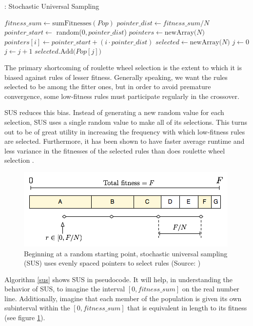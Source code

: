 \documentclass[11pt]{article}
\begin{document}
\begin{algorithm}
\caption{: Stochastic Universal Sampling}
\label{sus}
\begin{algorithmic}
\State $fitness\_sum \gets \text{sumFitnesses}(Pop)$
\State $pointer\_dist \gets fitness\_sum/N$
\State $pointer\_start \gets$ random($0,pointer\_dist$)
\State $pointers \gets \text{newArray($N $)}$
\State $pointers[i] \gets pointer\_start + (i \cdot pointer\_dist)$
\EndFor
\State $selected \gets \text{newArray($N$)}$
\State $j \gets 0$
\State $j \gets j + 1$
\EndWhile
\State $selected.\text{Add($Pop[j]$)}$
\EndFor
\EndFunction
\end{algorithmic}
\end{algorithm}

The primary shortcoming of roulette wheel selection is the extent to which it is biased against rules of lesser fitness. Generally speaking, we want the rules selected to be among the fitter ones, but in order to avoid premature convergence, some low-fitness rules must participate regularly in the crossover.

SUS reduces this bias. Instead of generating a new random value for each selection, SUS uses a single random value to make all of its selections. This turns out to be of great utility in increasing the frequency with which low-fitness rules are selected.
Furthermore, it has been shown to have faster average runtime and less variance in the fitnesses of the selected rules than does roulette wheel selection \cite{tobias_blickle_comparison_1995}.

\begin{figure}[h!]
\centering
\includegraphics[scale=0.6]{images/sus.png}
\caption{Beginning at a random starting point, stochastic universal sampling (SUS) uses evenly spaced pointers to select rules (Source: \cite{assumed_diagram_2007})}
\label{sus_graphic}
\end{figure}

Algorithm \ref{sus} shows SUS in pseudocode. It will help, in understanding the behavior of SUS, to imagine the interval $[0, fitness\_sum]$ on the real number line. Additionally, imagine that each member of the population is given its own subinterval within the $[0, fitness\_sum]$ that is equivalent in length to its fitness (see figure \ref{sus_graphic}).
\end{document}
